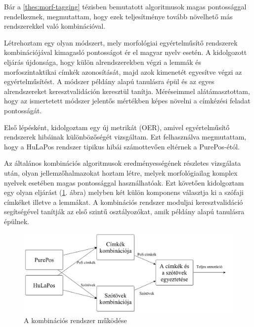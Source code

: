 \thesisline%


Bár a \ref{thes:morf-tagging} tézisben bemutatott algoritmusok magas pontossággal rendelkeznek, megmutattam, hogy ezek teljesítménye tovább növelhető más rendszerekkel való kombinációval. 

\begin{core}
\begin{thesis}
Létrehoztam egy olyan módszert, mely morfológiai egyértelműsítő rendszerek kombinációjával kimagasló pontosságot ér el magyar nyelv esetén.
A kidolgozott eljárás újdonsága, hogy külön alrendszerekben végzi a lemmák és morfoszintaktikai címkék azonosítását, majd azok kimenetét egyesítve végzi az egyértelműsítést.
A módszer példány alapú tanulásra épül és az egyes alrendszereket keresztvalidáción keresztül tanítja.
Méréseimmel alátámasztottam, hogy az ismertetett módszer jelentős mértékben képes növelni a címkézési feladat pontosságát. 
\end{thesis}

\begin{pub}
\cite{Laki2013a,Orosz2013c,Orosz2013d} 
\end{pub}
\end{core}

Első lépésként, kidolgoztam egy új metrikát (OER), amivel egyértelműsítő rendszerek hibáinak különbözőségét vizsgáltam. 
Ezt felhasználva megmutattam, hogy a HuLaPos rendszer tipikus hibái számottevően eltérnek a PurePos-étól. 

Az általános kombinációs algoritmusok eredményességének részletes vizsgálata után, olyan jellemzőhalmazokat hoztam létre, melyek morfológiailag komplex nyelvek esetében magas pontossággal használhatóak.
Ezt követően kidolgoztam egy olyan eljárást (\ref{fig:comb3_en}. ábra) melyben két külön komponens választja ki a szófaji címkéket illetve a lemmákat. 
A kombinációs rendszer moduljai keresztvalidáció segítségével tanítják az első szintű osztályozókat, amik példány alapú tanulásra épülnek.

\begin{figure}[H]
  \centering %
  \includegraphics[scale=0.15]{MorphTagging/comb3_hu.png} 
  \caption{A kombinációs rendszer működése}
  \label{fig:comb3_en}
\end{figure}

